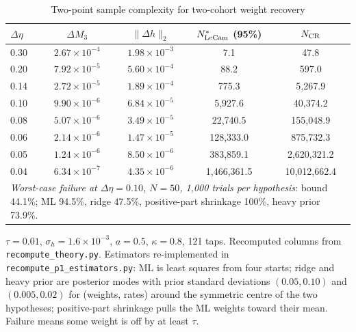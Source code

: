 \documentclass[12pt]{article}
\theoremstyle{definition}
\theoremstyle{remark}
\begin{document}
\begin{table}[t]\centering\small
\begin{threeparttable}
\caption{Two-point sample complexity for two-cohort weight recovery}\label{tab:lecam}
\begin{tabular}{lcccc}
\toprule
$\Delta\eta$ & $\Delta M_3$ & $\|\Delta h\|_2$ & $N^*_{\rm LeCam}$ (95\%) & $N_{\rm CR}$\\
\midrule
0.30 & $2.67\times10^{-4}$ & $1.98\times10^{-3}$ & 7.1 & 47.8\\
0.20 & $7.92\times10^{-5}$ & $5.60\times10^{-4}$ & 88.2 & 597.0\\
0.14 & $2.72\times10^{-5}$ & $1.89\times10^{-4}$ & 775.3 & 5{,}267.9\\
0.10 & $9.90\times10^{-6}$ & $6.84\times10^{-5}$ & 5{,}927.6 & 40{,}374.2\\
0.08 & $5.07\times10^{-6}$ & $3.49\times10^{-5}$ & 22{,}740.5 & 155{,}048.9\\
0.06 & $2.14\times10^{-6}$ & $1.47\times10^{-5}$ & 128{,}333.0 & 875{,}732.3\\
0.05 & $1.24\times10^{-6}$ & $8.50\times10^{-6}$ & 383{,}859.1 & 2{,}620{,}321.2\\
0.04 & $6.34\times10^{-7}$ & $4.35\times10^{-6}$ & 1{,}466{,}361.5 & 10{,}012{,}662.4\\
\midrule
\multicolumn{5}{p{0.85\textwidth}}{\emph{Worst-case failure at $\Delta\eta=0.10$, $N=50$, 1,000 trials per hypothesis}: bound 44.1\%; ML 94.5\%, ridge 47.5\%, positive-part shrinkage 100\%, heavy prior 73.9\%.}\\
\bottomrule
\end{tabular}
\begin{tablenotes}\footnotesize\item $\tau=0.01$, $\sigma_h=1.6\times10^{-3}$, $a=0.5$, $\kappa=0.8$, 121 taps. Recomputed columns from \texttt{recompute\_theory.py}. Estimators re-implemented in \texttt{recompute\_p1\_estimators.py}: ML is least squares from four starts; ridge and heavy prior are posterior modes with prior standard deviations $(0.05,0.10)$ and $(0.005,0.02)$ for (weights, rates) around the symmetric centre of the two hypotheses; positive-part shrinkage pulls the ML weights toward their mean. Failure means some weight is off by at least $\tau$.\end{tablenotes}
\end{threeparttable}
\end{table}
\end{document}
